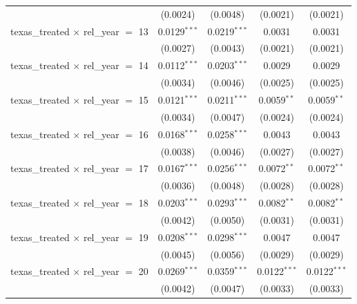 \begin{tabular}{lcccc}
                                                & (0.0024)       & (0.0048)        & (0.0021)        & (0.0021)\\   
   texas\_treated $\times$ rel\_year $=$ 13     & 0.0129$^{***}$ & 0.0219$^{***}$  & 0.0031          & 0.0031\\   
                                                & (0.0027)       & (0.0043)        & (0.0021)        & (0.0021)\\   
   texas\_treated $\times$ rel\_year $=$ 14     & 0.0112$^{***}$ & 0.0203$^{***}$  & 0.0029          & 0.0029\\   
                                                & (0.0034)       & (0.0046)        & (0.0025)        & (0.0025)\\   
   texas\_treated $\times$ rel\_year $=$ 15     & 0.0121$^{***}$ & 0.0211$^{***}$  & 0.0059$^{**}$   & 0.0059$^{**}$\\   
                                                & (0.0034)       & (0.0047)        & (0.0024)        & (0.0024)\\   
   texas\_treated $\times$ rel\_year $=$ 16     & 0.0168$^{***}$ & 0.0258$^{***}$  & 0.0043          & 0.0043\\   
                                                & (0.0038)       & (0.0046)        & (0.0027)        & (0.0027)\\   
   texas\_treated $\times$ rel\_year $=$ 17     & 0.0167$^{***}$ & 0.0256$^{***}$  & 0.0072$^{**}$   & 0.0072$^{**}$\\   
                                                & (0.0036)       & (0.0048)        & (0.0028)        & (0.0028)\\   
   texas\_treated $\times$ rel\_year $=$ 18     & 0.0203$^{***}$ & 0.0293$^{***}$  & 0.0082$^{**}$   & 0.0082$^{**}$\\   
                                                & (0.0042)       & (0.0050)        & (0.0031)        & (0.0031)\\   
   texas\_treated $\times$ rel\_year $=$ 19     & 0.0208$^{***}$ & 0.0298$^{***}$  & 0.0047          & 0.0047\\   
                                                & (0.0045)       & (0.0056)        & (0.0029)        & (0.0029)\\   
   texas\_treated $\times$ rel\_year $=$ 20     & 0.0269$^{***}$ & 0.0359$^{***}$  & 0.0122$^{***}$  & 0.0122$^{***}$\\   
                                                & (0.0042)       & (0.0047)        & (0.0033)        & (0.0033)\\   

\end{tabular}
